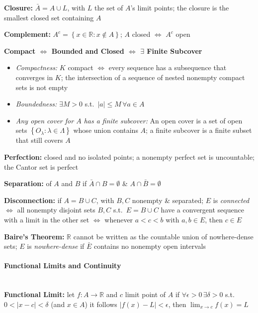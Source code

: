 \documentclass[8pt,twoside]{extarticle}
\begin{document}
\begin{multicols}{2}
   \textbf{Closure:} $\bar{A}=A\cup L$, with $L$ the set of $A$'s limit points; the closure is the smallest closed set containing $A$
  
   \textbf{Complement:} $A^c = \left\{x\in\mathbb{R}:x\notin A\right\}$; 
  $A$ closed $\Leftrightarrow$ $A^c$ open
  
  
   \textbf{Compact $\Leftrightarrow$ Bounded and Closed $\Leftrightarrow$ $\exists$ Finite Subcover}
  
  \begin{itemize}[itemsep=0em, topsep=0pt, partopsep=0pt,parsep=0pt, leftmargin=1.5em]
  \item \textit{Compactness:} $K$ compact $\Leftrightarrow$ every sequence has a subsequence that converges in $K$; the intersection of a sequence of nested nonempty compact sets is not empty
  \item \textit{Boundedness:} $\exists M>0$ s.t.\ $|a|\leq M \,\forall a\in A$
\item\textit{Any open cover for $A$ has a finite subcover:} An open cover is a set of open sets $\left\{O_\lambda:\lambda\in\Lambda\right\}$ whose union contains $A$; a finite subcover is a finite subset that still covers $A$
  \end{itemize}
  
 \textbf{Perfection:} closed and no isolated points; a nonempty perfect set is uncountable; the Cantor set is perfect

 \textbf{Separation:} of $A$ and $B$ if $\bar{A}\cap B =\emptyset$ \& $A\cap \bar{B}=\emptyset$

 \textbf{Disconnection:} if $A=B\cup C$, with $B,C$ nonempty \& separated;
\newline
$E$ is \textit{connected} $\Leftrightarrow$ all nonempty disjoint sets  $B,C$ s.t.\ $E=B\cup C$ have a convergent sequence with a limit in the other set $\Leftrightarrow$ whenever $a<c<b$ with $a,b\in E$, then $c \in E$

  \textbf{Baire's Theorem:} $\mathbb{R}$ cannot be written as the countable union of nowhere-dense sets; $E$ is \textit{nowhere-dense} if $\bar{E}$ contains no nonempty open intervals

\paragraph{Functional Limits and Continuity}  \ \\

 \textbf{Functional Limit:} let $f:A\to\mathbb{R}$ and $c$ limit point of $A$
if $\forall \epsilon > 0 \, \exists \delta>0$ s.t.\ $0<|x-c|<\delta$ (and $x\in A$) it follows $|f(x)-L|<\epsilon$, then $\lim_{x\to c} f(x)=L$


\end{multicols}
\end{document}
